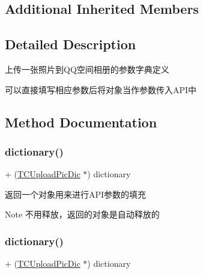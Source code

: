 \subsection*{Additional Inherited Members}


\subsection{Detailed Description}
上传一张照片到\+Q\+Q空间相册的参数字典定义 

可以直接填写相应参数后将对象当作参数传入\+A\+P\+I中 

\subsection{Method Documentation}
\mbox{\label{interface_t_c_upload_pic_dic_aaa8ccc672cb13af610eef64dfa2ae9d1}} 
\subsubsection{\texorpdfstring{dictionary()}{dictionary()}\hspace{0.1cm}{\footnotesize\ttfamily [1/2]}}
{\footnotesize\ttfamily + (\mbox{\hyperlink{interface_t_c_upload_pic_dic}{T\+C\+Upload\+Pic\+Dic}} $\ast$) dictionary \begin{DoxyParamCaption}{ }\end{DoxyParamCaption}}

返回一个对象用来进行\+A\+P\+I参数的填充 \begin{DoxyNote}{Note}
不用释放，返回的对象是自动释放的 
\end{DoxyNote}
\mbox{\label{interface_t_c_upload_pic_dic_aaa8ccc672cb13af610eef64dfa2ae9d1}} 
\subsubsection{\texorpdfstring{dictionary()}{dictionary()}\hspace{0.1cm}{\footnotesize\ttfamily [2/2]}}
{\footnotesize\ttfamily + (\mbox{\hyperlink{interface_t_c_upload_pic_dic}{T\+C\+Upload\+Pic\+Dic}} $\ast$) dictionary \begin{DoxyParamCaption}{ }\end{DoxyParamCaption}}

